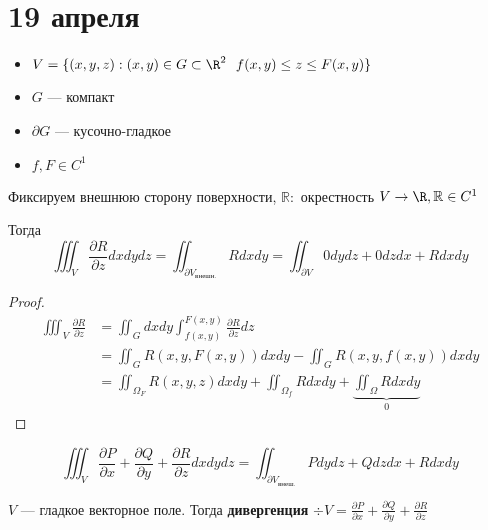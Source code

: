 \chapter{19 апреля}

\begin{theorem}\itemfix
    \begin{itemize}
        \item \(V = \{(x, y, z) : (x, y)\in G \subset \R^2 \ \ f(x, y) \leq z \leq F(x, y) \} \)
        \item \(G\) --- компакт
        \item \(\partial G\) --- кусочно-гладкое
        \item \(f, F\in C^1\)
    \end{itemize}

    Фиксируем внешнюю сторону поверхности, \(\mathbb R :\) окрестность \(V \to \R, \mathbb R \in C^1\)

    Тогда
    \[\iiint_V \frac{\partial R}{\partial z} dxdydz = \iint_{\partial V_\text{внешн.}} R dx dy = \iint_{\partial V} 0 dy dz + 0 dz dx + R dx dy\]
\end{theorem}
\begin{proof}

    \begin{align*}
        \iiint_V \frac{\partial R}{\partial z} & = \iint_G dx dy \int_{f(x, y)}^{F(x, y)} \frac{\partial R}{\partial z} dz                              \\
                                               & = \iint_G R(x, y, F(x, y)) dx dy - \iint_G R(x, y, f(x, y)) dx dy                                      \\
                                               & = \iint_{\Omega_F} R(x, y, z) dx dy + \iint_{\Omega_f} R dx dy + \underbrace{\iint_{\Omega} R dx dy}_0
    \end{align*}
\end{proof}

\begin{corollary}
    \[\iiint_V \frac{\partial P}{\partial x} + \frac{\partial Q}{\partial y} + \frac{\partial R}{\partial z} dx dy dz = \iint_{\partial V_{\text{внеш.}}} P dy dz + Q dz dx + R dx dy\]
\end{corollary}

\begin{definition}
    \(V\) --- гладкое векторное поле. Тогда \textbf{дивергенция} \(\div V = \frac{\partial P}{\partial x} + \frac{\partial Q}{\partial y} + \frac{\partial R}{\partial z}\)
\end{definition}

